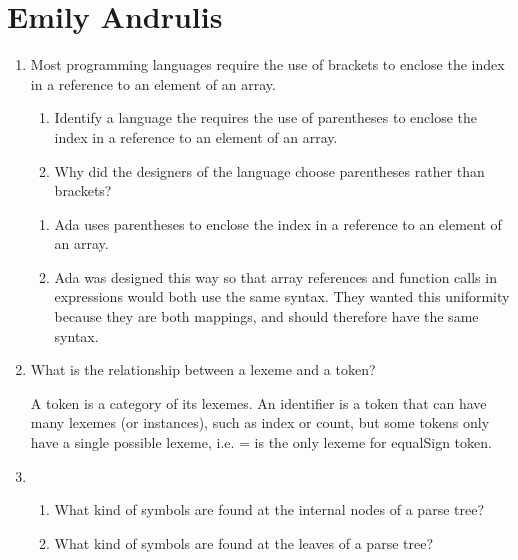 
\chapter{Emily Andrulis}

\begin{enumerate}
  \item Most programming languages require the use of brackets to
    enclose the index in a reference to an element of an array.
  \begin{enumerate}
    \item Identify a language the requires the use of parentheses
      to enclose the index in a reference to an element of an array.
    \item Why did the designers of the language choose parentheses
      rather than brackets?
    \end{enumerate}

  \begin{answer}

  \begin{enumerate}
    \item Ada uses parentheses to enclose the index in a reference to an element of an array.
    \item Ada was designed this way so that array references and function calls in expressions would both use the same syntax. They wanted this uniformity because they are both mappings, and should therefore have the same syntax.
    \end{enumerate}

    \end{answer}
    
  \item What is the relationship between a lexeme and a token?

  \begin{answer}

    A token is a category of its lexemes. An identifier is a token that can have many lexemes (or instances), such as index or count, but some tokens only have a single possible lexeme, i.e. = is the only lexeme for equalSign token.

    \end{answer}

  \item
  \begin{enumerate}
    \item What kind of symbols are found at the internal nodes of a
      parse tree?
    \item What kind of symbols are found at the leaves of a parse tree?
    \end{enumerate}


\end{enumerate}
